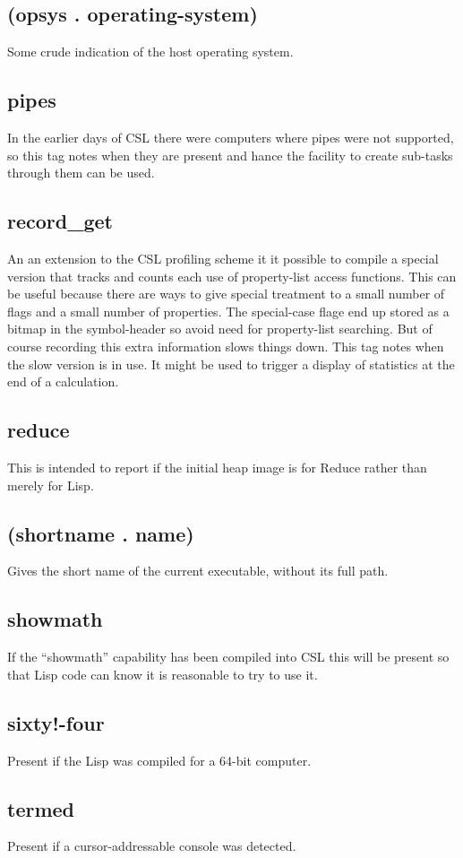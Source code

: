 \documentclass[a4paper,11pt]{article}
\begin{document}
\subsection{\ttfamily (opsys . operating-system)}
Some crude indication of the host operating system.
\subsection{\ttfamily pipes}
In the earlier days of CSL there were computers where pipes were not
supported, so this tag notes when they are present and hance the facility
to create sub-tasks through them can be used. 
\subsection{\ttfamily record\_get}
An an extension to the CSL profiling scheme it it possible to compile
a special version that tracks and counts each use of property-list access
functions. This can be useful because there are ways to give special
treatment to a small number of flags and a small number of properties. The
special-case flage end up stored as a bitmap in the symbol-header so avoid
need for property-list searching. But of course recording this extra
information slows things down. This tag notes when the slow version is
in use. It might be used to trigger a display of statistics at the end of
a calculation.
\subsection{\ttfamily reduce}
This is intended to report if the initial heap image is for Reduce rather than
merely for Lisp.
\subsection{\ttfamily (shortname . name)}
Gives the short name of the current executable, without its full path.
\subsection{\ttfamily showmath}
If the ``showmath'' capability has been compiled into CSL this will be present
so that Lisp code can know it is reasonable to try to use it.
\subsection{\ttfamily sixty!-four}
Present if the Lisp was compiled for a 64-bit computer.
\subsection{\ttfamily termed}
Present if a cursor-addressable console was detected.
\end{document}
